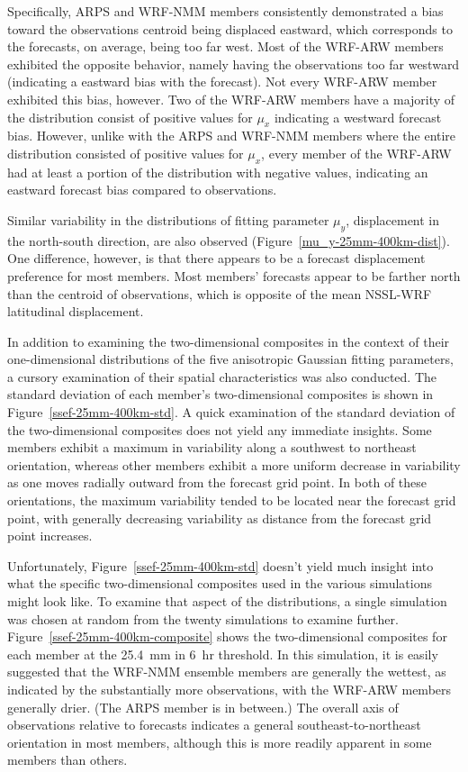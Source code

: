 Specifically, ARPS and WRF-NMM members consistently demonstrated a bias toward the observations centroid being displaced eastward, which corresponds to the forecasts, on average, being too far west.
Most of the WRF-ARW members exhibited the opposite behavior, namely having the observations too far westward (indicating a eastward bias with the forecast).
Not every WRF-ARW member exhibited this bias, however.
Two of the WRF-ARW members have a majority of the distribution consist of positive values for $\mu_x$ indicating a westward forecast bias.
However, unlike with the ARPS and WRF-NMM members where the entire distribution consisted of positive values for $\mu_x$, every member of the WRF-ARW had at least a portion of the distribution with negative values, indicating an eastward forecast bias compared to observations.


Similar variability in the distributions of fitting parameter $\mu_y$, displacement in the north-south direction, are also observed (\mbox{Figure \ref{mu_y-25mm-400km-dist}}).
One difference, however, is that there appears to be a forecast displacement preference for most members.
Most members' forecasts appear to be farther north than the centroid of observations, which is opposite of the mean NSSL-WRF latitudinal displacement.


In addition to examining the two-dimensional composites in the context of their one-dimensional distributions of the five anisotropic Gaussian fitting parameters, a cursory examination of their spatial characteristics was also conducted.
The standard deviation of each member's two-dimensional composites is shown in \mbox{Figure \ref{ssef-25mm-400km-std}}.
A quick examination of the standard deviation of the two-dimensional composites does not yield any immediate insights.
Some members exhibit a maximum in variability along a southwest to northeast orientation, whereas other members exhibit a more uniform decrease in variability as one moves radially outward from the forecast grid point.
In both of these orientations, the maximum variability tended to be located near the forecast grid point, with generally decreasing variability as distance from the forecast grid point increases.


Unfortunately, \mbox{Figure \ref{ssef-25mm-400km-std}} doesn't yield much insight into what the specific two-dimensional composites used in the various simulations might look like.
To examine that aspect of the distributions, a single simulation was chosen at random from the twenty simulations to examine further.
\mbox{Figure \ref{ssef-25mm-400km-composite}} shows the two-dimensional composites for each member at the \mbox{25.4 mm} in \mbox{6 hr} threshold.
In this simulation, it is easily suggested that the WRF-NMM ensemble members are generally the wettest, as indicated by the substantially more observations, with the WRF-ARW members generally drier.
(The ARPS member is in between.)
The overall axis of observations relative to forecasts indicates a general southeast-to-northeast orientation in most members, although this is more readily apparent in some members than others.


